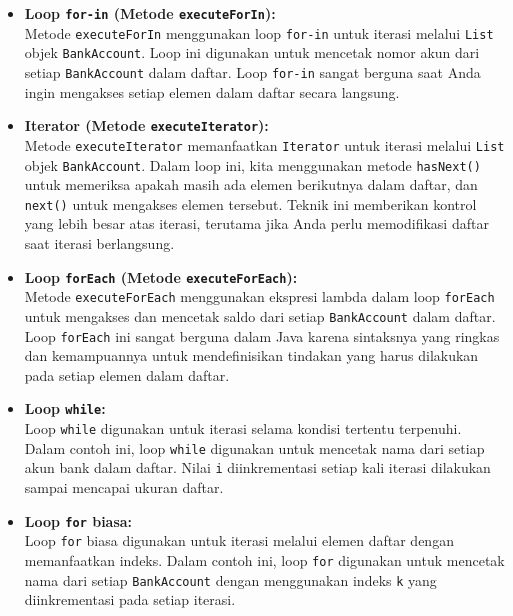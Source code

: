 \begin{itemize}
	\item \textbf{Loop \texttt{for-in} (Metode \texttt{executeForIn}):} \\
	Metode \texttt{executeForIn} menggunakan loop \texttt{for-in} untuk iterasi melalui \texttt{List} objek \texttt{BankAccount}. Loop ini digunakan untuk mencetak nomor akun dari setiap \texttt{BankAccount} dalam daftar. Loop \texttt{for-in} sangat berguna saat Anda ingin mengakses setiap elemen dalam daftar secara langsung.
	
	\item \textbf{Iterator (Metode \texttt{executeIterator}):} \\
	Metode \texttt{executeIterator} memanfaatkan \texttt{Iterator} untuk iterasi melalui \texttt{List} objek \texttt{BankAccount}. Dalam loop ini, kita menggunakan metode \texttt{hasNext()} untuk memeriksa apakah masih ada elemen berikutnya dalam daftar, dan \texttt{next()} untuk mengakses elemen tersebut. Teknik ini memberikan kontrol yang lebih besar atas iterasi, terutama jika Anda perlu memodifikasi daftar saat iterasi berlangsung.
	
	\item \textbf{Loop \texttt{forEach} (Metode \texttt{executeForEach}):} \\
	Metode \texttt{executeForEach} menggunakan ekspresi lambda dalam loop \texttt{forEach} untuk mengakses dan mencetak saldo dari setiap \texttt{BankAccount} dalam daftar. Loop \texttt{forEach} ini sangat berguna dalam Java karena sintaksnya yang ringkas dan kemampuannya untuk mendefinisikan tindakan yang harus dilakukan pada setiap elemen dalam daftar.
	
	\item \textbf{Loop \texttt{while}:} \\
	Loop \texttt{while} digunakan untuk iterasi selama kondisi tertentu terpenuhi. Dalam contoh ini, loop \texttt{while} digunakan untuk mencetak nama dari setiap akun bank dalam daftar. Nilai \texttt{i} diinkrementasi setiap kali iterasi dilakukan sampai mencapai ukuran daftar.
	
	\item \textbf{Loop \texttt{for} biasa:} \\
	Loop \texttt{for} biasa digunakan untuk iterasi melalui elemen daftar dengan memanfaatkan indeks. Dalam contoh ini, loop \texttt{for} digunakan untuk mencetak nama dari setiap \texttt{BankAccount} dengan menggunakan indeks \texttt{k} yang diinkrementasi pada setiap iterasi.
\end{itemize}



